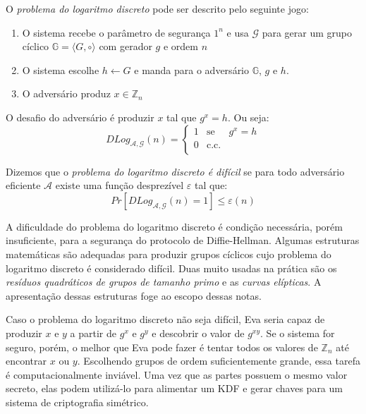 O {\em problema do logaritmo discreto} pode ser descrito pelo seguinte jogo:
\begin{enumerate}
\item O sistema recebe o parâmetro de segurança $1^n$ e usa $\mathcal{G}$ para gerar um grupo cíclico $\mathbb{G} = \langle G, \circ \rangle$ com gerador $g$ e ordem $n$
\item O sistema escolhe $h \leftarrow G$ e manda para o adversário $\mathbb{G}$, $g$ e $h$. 
\item O adversário produz $x \in \mathbb{Z}_n$
\end{enumerate}

O desafio do adversário é produzir $x$ tal que $g^x = h$.
Ou seja:
\begin{displaymath}
  DLog_{\mathcal{A}, \mathcal{G}}(n) = \left\{
    \begin{array}{lcl}
      1 & \textrm{se} & g^x = h\\
      0 & \textrm{c.c.} &\\
    \end{array}
    \right.
\end{displaymath}

Dizemos que o {\em problema do logaritmo discreto é difícil} se para todo adversário eficiente $\mathcal{A}$ existe uma função desprezível $\varepsilon$ tal que:
\begin{displaymath}
  Pr[DLog_{\mathcal{A}, \mathcal{G}}(n) = 1] \leq \varepsilon(n)
\end{displaymath}

A dificuldade do problema do logaritmo discreto é condição necessária, porém insuficiente, para a segurança do protocolo de Diffie-Hellman.
Algumas estruturas matemáticas são adequadas para produzir grupos cíclicos cujo problema do logaritmo discreto é considerado difícil.
Duas muito usadas na prática são os {\em resíduos quadráticos de grupos de tamanho primo} e as {\em curvas elípticas}.
A apresentação dessas estruturas foge ao escopo dessas notas.


Caso o problema do logaritmo discreto não seja difícil, Eva seria capaz de produzir $x$ e $y$ a partir de $g^x$ e $g^y$ e descobrir o valor de $g^{xy}$.
Se o sistema for seguro, porém, o melhor que Eva pode fazer é tentar todos os valores de $\mathbb{Z}_n$ até encontrar $x$ ou $y$.
Escolhendo grupos de ordem suficientemente grande, essa tarefa é computacionalmente inviável.
Uma vez que as partes possuem o mesmo valor secreto, elas podem utilizá-lo para alimentar um KDF e gerar chaves para um sistema de criptografia simétrico.

